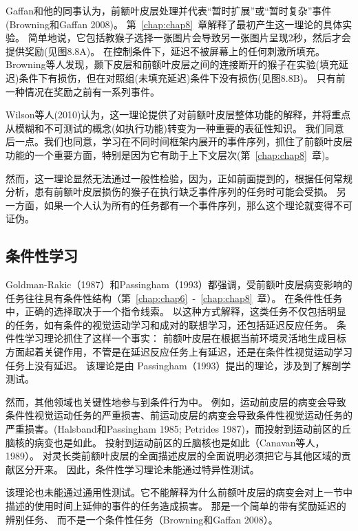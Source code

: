 Gaffan和他的同事认为，前额叶皮层处理并代表“暂时扩展”或“暂时复杂”事件(Browning和Gaffan 2008)。
第~\ref{chap:chap8}~章解释了最初产生这一理论的具体实验。
简单地说，它包括教猴子选择一张图片会导致另一张图片呈现2秒，然后才会提供奖励(见图8.8A)。
在控制条件下，延迟不被屏幕上的任何刺激所填充。
Browning等人发现，颞下皮层和前额叶皮层之间的连接断开的猴子在实验(填充延迟)条件下有损伤，但在对照组(未填充延迟)条件下没有损伤(见图8.8B)。
只有前一种情况在奖励之前有一系列事件。
\par


Wilson等人(2010)认为，这一理论提供了对前额叶皮层整体功能的解释，并将重点从模糊和不可测试的概念(如执行功能)转变为一种重要的表征性知识。
我们同意后一点。我们也同意，学习在不同时间框架内展开的事件序列，抓住了前额叶皮层功能的一个重要方面，特别是因为它有助于上下文层次(第~\ref{chap:chap8}~章)。
\par


然而，这一理论显然无法通过一般性检验，因为，正如前面提到的，根据任何常规分析，患有前额叶皮层损伤的猴子在执行缺乏事件序列的任务时可能会受损。
另一方面，如果一个人认为所有的任务都有一个事件序列，那么这个理论就变得不可证伪。



\subsection{条件性学习}

Goldman-Rakic（1987）和Passingham（1993）都强调，受前额叶皮层病变影响的任务往往具有条件性结构（第~\ref{chap:chap6}~-~\ref{chap:chap8}~章）。
在条件性任务中，正确的选择取决于一个指令线索。
以这种方式解释，这类任务不仅包括明显的任务，如有条件的视觉运动学习和成对的联想学习，还包括延迟反应任务。
条件性学习理论抓住了这样一个事实：
前额叶皮层在根据当前环境灵活地生成目标方面起着关键作用，不管是在延迟反应任务上有延迟，还是在条件性视觉运动学习任务上没有延迟。
该理论是由 Passingham（1993）提出的理论，涉及到了解剖学测试。
\par


然而，其他领域也关键性地参与到条件行为中。
例如，运动前皮层的病变会导致条件性视觉运动任务的严重损害、前运动皮层的病变会导致条件性视觉运动任务的严重损害。(Halsband和Passingham 1985; Petrides 1987)，而投射到运动前区的丘脑核的病变也是如此。
投射到运动前区的丘脑核也是如此（Canavan等人，1989）。
对灵长类前额叶皮层的全面描述皮层的全面说明必须把它与其他区域的贡献区分开来。
因此，条件性学习理论未能通过特异性测试。
\par


该理论也未能通过通用性测试。它不能解释为什么前额叶皮层的病变会对上一节中描述的使用时间上延伸的事件的任务造成损害。
那是一个简单的带有奖励延迟的辨别任务、 而不是一个条件性任务（Browning和Gaffan 2008）。



